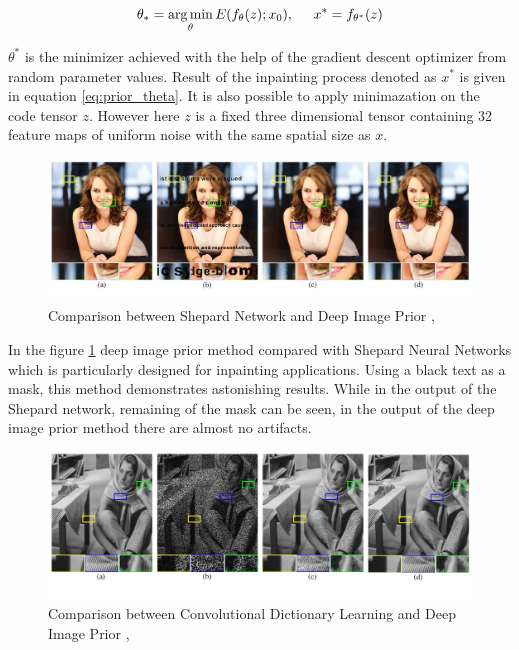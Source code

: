 \begin{equation}
    \theta_{\ast} = \operatorname*{arg\,min}_{\theta}E(f_{\theta}(z);x_{0}) , \hspace{5mm} x^{\ast} = f_{\theta^{\ast}}(z)
    \label{eq:prior_theta}
\end{equation}

\(\theta^{\ast}\) is the minimizer achieved with the help of the gradient descent optimizer from random parameter values. Result of the inpainting process denoted as \(x^{\ast}\) is given in equation \ref{eq:prior_theta}. It is also possible to apply minimazation on the code tensor \(z\). However here \(z\) is a fixed three dimensional tensor containing 32 feature maps of uniform noise with the same spatial size as \(x\).

\begin{figure}[h!]
    \centering
    \includegraphics[width=13cm]{figures/chapter4/imprior1.png}
    \caption{Comparison between Shepard Network and Deep Image Prior \cite{shepard_nn}, \cite{deep_image_prior}}
    \label{fig:prior_shepard_comparison}
\end{figure}

In the figure \ref{fig:prior_shepard_comparison} deep image prior method compared with Shepard Neural Networks \cite{shepard_nn} which is particularly designed for inpainting applications. Using a black text as a mask, this method demonstrates astonishing results. While in the output of the Shepard network, remaining of the mask can be seen, in the output of the deep image prior method there are almost no artifacts.

\begin{figure}[h!]
    \centering
    \includegraphics[width=13cm]{figures/chapter4/imprior2.png}
    \caption{Comparison between Convolutional Dictionary Learning and Deep Image Prior \cite{conv_dict_learning}, \cite{deep_image_prior}}
    \label{fig:prior_dict_camparison}
\end{figure}

